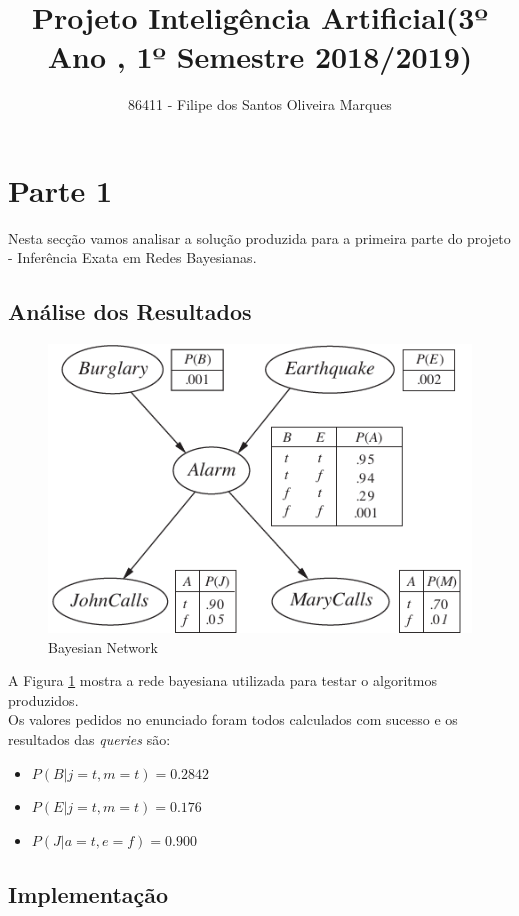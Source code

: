 \documentclass[9pt, a4paper, twocolumn]{article}
\author{86411 - Filipe dos Santos Oliveira Marques}
\title{Projeto Inteligência Artificial(3º Ano , 1º Semestre 2018/2019)}
\begin{document}
\maketitle
\section{Parte 1}
\hspace{10mm}Nesta secção vamos analisar a solução produzida para a primeira parte do projeto - Inferência Exata em Redes Bayesianas.
\subsection{Análise dos Resultados}
\begin{figure}[h!]
	\includegraphics[scale=.45]{images/bn-b.png}
	\caption{Bayesian Network}
	\label{fig:bn1}
\end{figure}
A Figura \ref{fig:bn1} mostra a rede bayesiana utilizada para testar o algoritmos produzidos. \\
Os valores pedidos no enunciado foram todos calculados com sucesso e os resultados das \textit{queries} são:
\begin{itemize}
\item $P(B| j=t, m=t)=0.2842$
\item $P(E| j=t, m=t)=0.176$
\item $P(J| a=t, e=f)=0.900$
\end{itemize}
\subsection{Implementação}
\end{document}
